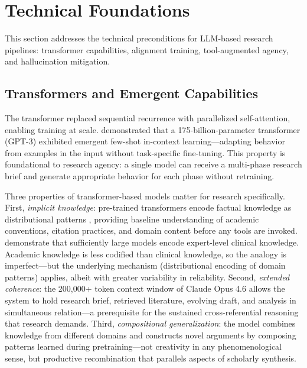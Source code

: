 \documentclass{article}
\begin{document}

\section{Technical Foundations}
\label{sec:tech}

This section addresses the technical preconditions for LLM-based research pipelines: transformer capabilities, alignment training, tool-augmented agency, and hallucination mitigation.

\subsection{Transformers and Emergent Capabilities}

The transformer \citep{vaswani2017attention} replaced sequential recurrence with parallelized self-attention, enabling training at scale. \citet{brown2020gpt3} demonstrated that a 175-billion-parameter transformer (GPT-3) exhibited emergent few-shot in-context learning---adapting behavior from examples in the input without task-specific fine-tuning. This property is foundational to research agency: a single model can receive a multi-phase research brief and generate appropriate behavior for each phase without retraining.

Three properties of transformer-based models matter for research specifically. First, \textit{implicit knowledge}: pre-trained transformers encode factual knowledge as distributional patterns \citep{petroni2019language}, providing baseline understanding of academic conventions, citation practices, and domain content before any tools are invoked. \citet{singhal2023medpalm} demonstrate that sufficiently large models encode expert-level clinical knowledge. Academic knowledge is less codified than clinical knowledge, so the analogy is imperfect---but the underlying mechanism (distributional encoding of domain patterns) applies, albeit with greater variability in reliability. Second, \textit{extended coherence}: the 200,000+ token context window of Claude Opus 4.6 allows the system to hold research brief, retrieved literature, evolving draft, and analysis in simultaneous relation---a prerequisite for the sustained cross-referential reasoning that research demands. Third, \textit{compositional generalization}: the model combines knowledge from different domains and constructs novel arguments by composing patterns learned during pretraining---not creativity in any phenomenological sense, but productive recombination that parallels aspects of scholarly synthesis.
\end{document}
